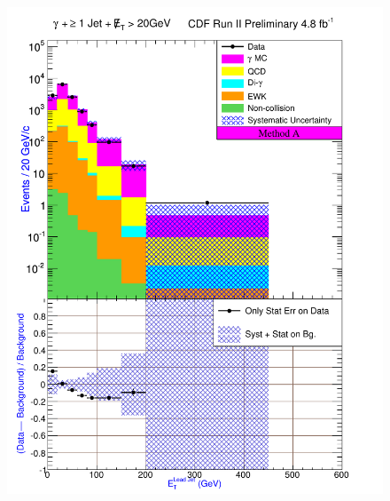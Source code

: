 \begin{figure}[h!]
{\includegraphics[keepaspectratio=true, scale=\resultsHistScale]{G30JetsMet20_MtdA_plot1_Et_j1.pdf}
}


\end{figure}
